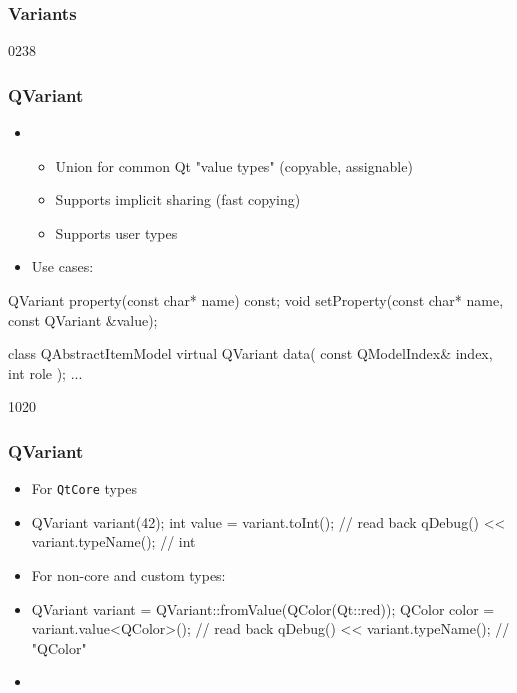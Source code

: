 %
%
%
%

\subsubsection{Variants}

\begin{slide}[fragile]{0238}\frametitle{QVariant}
\begin{itemize}
  \item {} 
  \begin{itemize}
    \item Union for common Qt "value types" (copyable, assignable)
    \item Supports implicit sharing (fast copying)
    \item Supports user types
  \end{itemize}\medskip
\item Use cases:
\end{itemize}
\begin{cpp}
QVariant property(const char* name) const;
void setProperty(const char* name, const QVariant &value);
\end{cpp}\medskip

\begin{cpp}
class QAbstractItemModel {
  virtual QVariant data( const QModelIndex& index, int role );
  ...
}
\end{cpp}
\end{slide}

\begin{slide}[fragile]{1020}\frametitle{QVariant}
\begin{itemize}
  \item For \texttt{QtCore} types  
  \item[] \begin{cpp}
QVariant variant(42);
int value = variant.toInt(); // read back
qDebug() << variant.typeName(); // int
\end{cpp}\vspace*{3mm}
\item For non-core and custom types:
  \item[] \begin{cpp}
QVariant variant = QVariant::fromValue(QColor(Qt::red));
QColor color = variant.value<QColor>(); // read back
qDebug() << variant.typeName(); // "QColor"
\end{cpp}\vspace*{3mm}
\item[] 
\end{itemize}
\end{slide}

